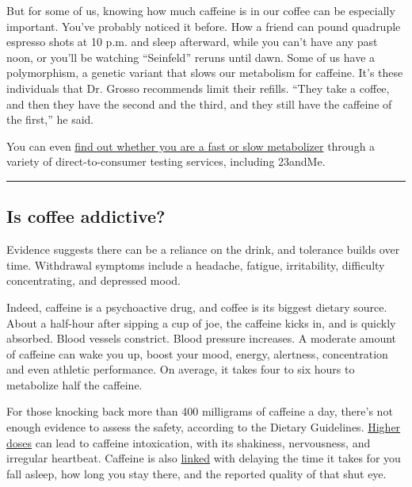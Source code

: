 But for some of us, knowing how much caffeine is in our coffee can be
especially important. You've probably noticed it before. How a friend
can pound quadruple espresso shots at 10 p.m. and sleep afterward, while
you can't have any past noon, or you'll be watching ``Seinfeld'' reruns
until dawn. Some of us have a polymorphism, a genetic variant that slows
our metabolism for caffeine. It's these individuals that Dr. Grosso
recommends limit their refills. ``They take a coffee, and then they have
the second and the third, and they still have the caffeine of the
first,'' he said.

You can even
\href{https://well.blogs.nytimes.com/2016/07/12/for-coffee-drinkers-the-buzz-may-be-in-your-genes/}{find
out whether you are a fast or slow metabolizer} through a variety of
direct-to-consumer testing services, including 23andMe.

\begin{center}\rule{0.5\linewidth}{\linethickness}\end{center}

\hypertarget{is-coffee-addictive}{%
\subsection{Is coffee addictive?}\label{is-coffee-addictive}}

Evidence suggests there can be a reliance on the drink, and tolerance
builds over time. Withdrawal symptoms include a headache, fatigue,
irritability, difficulty concentrating, and depressed mood.

Indeed, caffeine is a psychoactive drug, and coffee is its biggest
dietary source. About a half-hour after sipping a cup of joe, the
caffeine kicks in, and is quickly absorbed. Blood vessels constrict.
Blood pressure increases. A moderate amount of caffeine can wake you up,
boost your mood, energy, alertness, concentration and even athletic
performance. On average, it takes four to six hours to metabolize half
the caffeine.

For those knocking back more than 400 milligrams of caffeine a day,
there's not enough evidence to assess the safety, according to the
Dietary Guidelines.
\href{https://www.liebertpub.com/doi/10.1089/caff.2019.0020}{Higher
doses} can lead to caffeine intoxication, with its shakiness,
nervousness, and irregular heartbeat. Caffeine is also
\href{https://www.sciencedirect.com/science/article/abs/pii/S1087079216000150?via\%3Dihub}{linked}
with delaying the time it takes for you fall asleep, how long you stay
there, and the reported quality of that shut eye.

